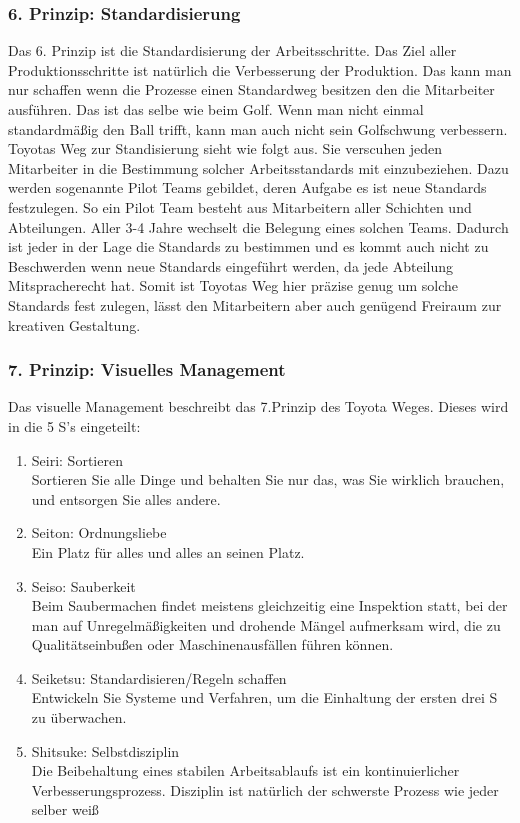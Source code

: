 \documentclass[a4paper,12pt]{scrartcl}
\begin{document}
\subsubsection{6. Prinzip: Standardisierung}

Das 6. Prinzip ist die Standardisierung der Arbeitsschritte. Das Ziel aller Produktionsschritte ist natürlich die Verbesserung der Produktion. Das kann man nur schaffen wenn die Prozesse einen Standardweg besitzen den die Mitarbeiter ausführen. Das ist das selbe wie beim Golf. Wenn man nicht einmal standardmäßig den Ball trifft, kann man auch nicht sein Golfschwung verbessern. 
Toyotas Weg zur Standisierung sieht wie folgt aus. Sie verscuhen jeden Mitarbeiter in die Bestimmung solcher Arbeitsstandards mit einzubeziehen. Dazu werden sogenannte Pilot Teams gebildet, deren Aufgabe es ist neue Standards festzulegen. So ein Pilot Team besteht aus Mitarbeitern aller Schichten und Abteilungen. Aller 3-4 Jahre wechselt die Belegung eines solchen Teams. Dadurch ist jeder in der Lage die Standards zu bestimmen und es kommt auch nicht zu Beschwerden wenn neue Standards eingeführt werden, da jede Abteilung Mitspracherecht hat. Somit ist Toyotas Weg hier präzise genug um solche Standards fest zulegen, lässt den Mitarbeitern aber auch genügend Freiraum zur kreativen Gestaltung.

\subsubsection{7. Prinzip: Visuelles Management}

Das visuelle Management beschreibt das 7.Prinzip des Toyota Weges. Dieses wird in die 5 S's eingeteilt:

\begin{enumerate}
    \item Seiri: Sortieren\\
    Sortieren Sie alle Dinge und behalten Sie nur das, was Sie wirklich brauchen, und entsorgen Sie alles andere.
    \item Seiton: Ordnungsliebe \\
    Ein Platz für alles und alles an seinen Platz.
    \item Seiso: Sauberkeit\\
    Beim Saubermachen findet meistens gleichzeitig eine Inspektion statt, bei der man auf Unregelmäßigkeiten und drohende Mängel aufmerksam wird, die zu Qualitätseinbußen oder Maschinenausfällen führen können.
    \item Seiketsu: Standardisieren/Regeln schaffen \\
    Entwickeln Sie Systeme und Verfahren, um die Einhaltung der ersten drei S zu überwachen.
    \item Shitsuke: Selbstdisziplin \\
    Die Beibehaltung eines stabilen Arbeitsablaufs ist ein kontinuierlicher Verbesserungsprozess. Disziplin ist natürlich der schwerste Prozess wie jeder selber weiß
\end{enumerate}
\end{document}
